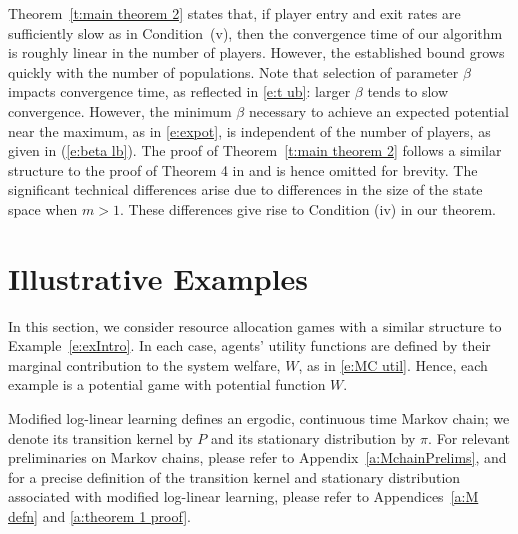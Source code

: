 Theorem~\ref{t:main theorem 2} states that, if player entry and exit rates are sufficiently slow as in Condition~(v), then the convergence time of our algorithm is roughly linear in the number of players. However, the established bound grows quickly with the number of populations. Note that selection of parameter $\beta$ impacts convergence time, as reflected in \eqref{e:t ub}: larger $\beta$ tends to slow convergence. However, the minimum $\beta$ necessary to achieve an expected potential near the maximum, as in \eqref{e:expot}, is independent of the number of players, as given in (\ref{e:beta lb}). The proof of Theorem~\ref{t:main theorem 2} follows a similar structure to the proof of Theorem 4 in \cite{Shah2010} and is hence omitted for brevity. The significant technical differences arise due to differences in the size of the state space when $m>1$. These differences give rise to Condition (iv) in our theorem. %



\section{Illustrative Examples }\label{s:examples}


In this section, we consider resource allocation games with a similar structure to Example~\ref{e:exIntro}. In each case, agents' utility functions are defined by their marginal contribution to the system welfare, $W$, as in \eqref{e:MC util}. Hence, each example is a potential game with potential function $W$.



Modified log-linear learning defines an ergodic, continuous time Markov chain; we denote its transition kernel by $P$ and its stationary distribution by $\pi.$ For relevant preliminaries on Markov chains, please refer to Appendix~\ref{a:MchainPrelims},  and for a precise definition of the transition kernel and stationary distribution associated with modified log-linear learning, please refer to Appendices~\ref{a:M defn} and \ref{a:theorem 1 proof}. 



